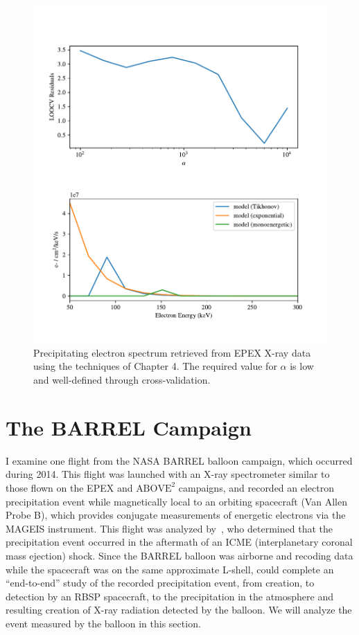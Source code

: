 \begin{figure}[p]
    \centering
    \includegraphics[width=1.0\textwidth]{figures/chapter_5/epex_tk_inv/epex_tk_inv2.pdf}
    \caption{Precipitating electron spectrum retrieved from EPEX X-ray data using the techniques of Chapter 4. The required value for $\alpha$ is low and well-defined through cross-validation.}
    \label{epex_tk_inv}
\end{figure}

\section{The BARREL Campaign}

I examine one flight from the NASA BARREL balloon campaign, which occurred during 2014. This flight was launched with an X-ray spectrometer similar to those flown on the EPEX and  $\text{ABOVE}^2$ campaigns, and recorded an electron precipitation event while magnetically local to an orbiting spacecraft (Van Allen Probe B), which provides conjugate measurements of energetic electrons via the MAGEIS instrument. This flight was analyzed by~\citet{Halford2015}, who determined that the precipitation event occurred in the aftermath of an ICME (interplanetary coronal mass ejection) shock. Since the BARREL balloon was airborne and recoding data while the spacecraft was on the same approximate L-shell, \citet{Halford2015} could complete an ``end-to-end'' study of the recorded precipitation event, from creation, to detection by an RBSP spacecraft, to the precipitation in the atmosphere and resulting creation of X-ray radiation detected by the balloon. We will analyze the event measured by the balloon in this section.

